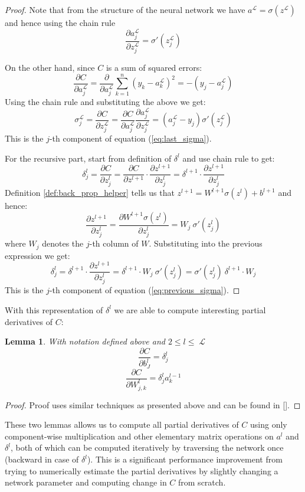 \documentclass[a4paper]{article}
\theoremstyle{break}
\newtheorem{lemma}[theorem]{Lemma}
\newcommand{\Part}[2]{\frac{\partial #1}{\partial #2}}
\DeclareMathOperator{\La}{\mathcal{L}}
\begin{document}
\begin{proof}
    Note that from the structure of the neural network we have
    $a^{\La} = \sigma(z^{\La})$ and hence using the chain rule
    $$ \Part{a_j^{\La}}{z_j^{\La}} = \sigma' (z_j^{\La}) $$
    
    On the other hand, since $C$ is a sum of squared errors:
    $$ \Part{C}{a_j^{\La}} = \Part{}{a_j^{\La}} \sum_{k=1}^n (y_k - a_k^{\La})^2 = - (y_j - a_j^{\La})$$
    Using the chain rule and substituting the above we get:
    $$ \sigma_j^{\La} = \Part{C}{z_j^{\La}} = \Part{C}{a_j^{\La}} \Part{a_j^{\La}}{z_j^{\La}} = (a_j^{\La} - y_j) \sigma' (z_j^{\La})$$
    This is the $j$-th component of equation (\ref{eq:last_sigma}).
    
    For the recursive part, start from definition of $\delta^l$ and use chain rule to get:
    $$ \delta^l_j = \Part{C}{z_j^l} =
       \Part{C}{z^{l+1}} \cdot \Part{z^{l+1}}{z_j^l} = 
       \delta^{l+1}      \cdot \Part{z^{l+1}}{z_j^l} $$
    Definition \ref{def:back_prop_helper} tells us that
    $ z^{l+1} = W^{l+1} \sigma(z^{l}) + b^{l+1} $
    and hence:
    $$  \Part{z^{l+1}}{z^l_j} =
        \Part{W^{l+1} \sigma(z^l)}{z_j^l} = W_{j} ~ \sigma'(z_j^l)$$
    where $W_{j}$ denotes the $j$-th column of $W$. Substituting into the previous expression we get:
    $$ \delta^l_j = \delta^{l+1} \cdot \Part{z^{l+1}}{z_j^l}
     = \delta^{l+1} \cdot W_{j} ~ \sigma'(z_j^l) = \sigma'(z_j^l) ~ \delta^{l+1} \cdot W_{j}$$
    This is the $j$-th component of equation (\ref{eq:previous_sigma}).
\end{proof}

With this representation of $\delta^l$ we are able to compute interesting partial derivatives of $C$:
\begin{lemma}
    With notation defined above and $ 2 \leq l \leq \La$
     $$ \Part{C}{b_J^l} = \delta_j^l $$
     $$ \Part{C}{W^l_{j, k}} = \delta^l_j a_k^{l-1} $$
\end{lemma}
\begin{proof}
    Proof uses similar techniques as presented above and can be found in [].
\end{proof}

These two lemmas allows us to compute all partial derivatives of $C$ using only component-wise multiplication and other elementary matrix operations on $a^l$ and $\delta^l$, both of which can be computed iteratively by traversing the network once (backward in case of $\delta^l$). This is a significant performance improvement from trying to numerically estimate the partial derivatives by slightly changing a network parameter and computing change in $C$ from scratch.
\end{document}
